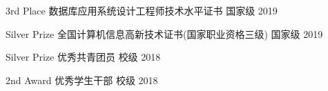 \begin{cvhonors}

  \cvhonor
    {3rd Place} %
    {数据库应用系统设计工程师技术水平证书} %
    {国家级} %
    {2019} %

  \cvhonor
    {Silver Prize} %
    {全国计算机信息高新技术证书(国家职业资格三级)} %
    {国家级} %
    {2019} %

  \cvhonor
    {Silver Prize} %
    {优秀共青团员} %
    {校级} %
    {2018} %

  \cvhonor
    {2nd Award} %
    {优秀学生干部} %
    {校级} %
    {2018} %
    
\end{cvhonors}
